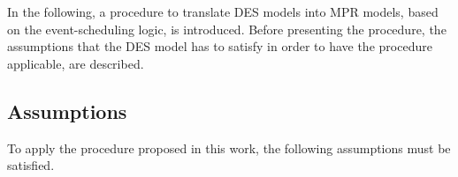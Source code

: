 \documentclass[]{interact}
\theoremstyle{plain}%
\theoremstyle{definition}
\theoremstyle{remark}
\begin{document}


In the following, a procedure to translate DES models into MPR models, based on the event-scheduling logic, is introduced. Before presenting the procedure, the assumptions that the DES model has to satisfy in order to have the procedure applicable, are described.

\subsection{Assumptions}
To apply the procedure proposed in this work, the following assumptions must be satisfied.
\end{document}
